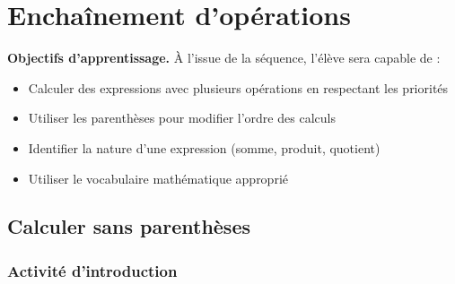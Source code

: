 \chapter{Enchaînement d'opérations}

\begin{objectifsbox}
\textbf{Objectifs d'apprentissage.} À l'issue de la séquence, l'élève sera capable de :
\begin{itemize}
\item Calculer des expressions avec plusieurs opérations en respectant les priorités
\item Utiliser les parenthèses pour modifier l'ordre des calculs
\item Identifier la nature d'une expression (somme, produit, quotient)
\item Utiliser le vocabulaire mathématique approprié
\end{itemize}
\end{objectifsbox}

\section{Calculer sans parenthèses}

\subsection{Activité d'introduction}

